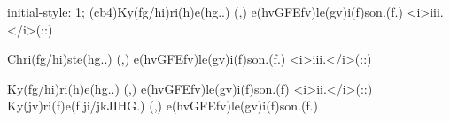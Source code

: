 initial-style: 1;
(cb4)Ky(fg/hi)ri(h)e(hg..) (,) e(hvGFEfv)le(gv)i(f)son.(f.) <i>iii.</i>(::)

Chri(fg/hi)ste(hg..) (,) e(hvGFEfv)le(gv)i(f)son.(f.) <i>iii.</i>(::)

Ky(fg/hi)ri(h)e(hg..) (,) e(hvGFEfv)le(gv)i(f)son.(f) <i>ii.</i>(::)
Ky(jv)ri(f)e(f.ji/jkJIHG.) (,) e(hvGFEfv)le(gv)i(f)son.(f.)
